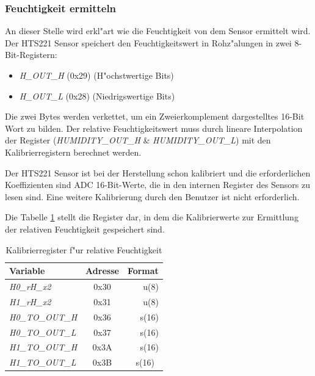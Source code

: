 \subsubsection{Feuchtigkeit ermitteln}

An dieser Stelle wird erkl"art wie die Feuchtigkeit von dem Sensor ermittelt wird.
Der HTS221 Sensor speichert den Feuchtigkeitswert in Rohz"alungen in zwei 8-Bit-Registern:
\begin{itemize}
	\item \textit{H\_OUT\_H} (0x29) (H"ochstwertige Bits)
	\item \textit{H\_OUT\_L} (0x28) (Niedrigswertige Bits)
\end{itemize}

Die zwei Bytes werden verkettet, um ein Zweierkomplement dargestelltes 16-Bit Wort zu bilden. Der relative Feuchtigkeitswert muss durch lineare Interpolation
der Register (\textit{HUMIDITY\_OUT\_H} \& \textit{HUMIDITY\_OUT\_L}) mit den Kalibrierregistern berechnet werden.

Der HTS221 Sensor ist bei der Herstellung schon kalibriert und die erforderlichen Koeffizienten sind ADC 16-Bit-Werte, die in den internen Register des Sensors zu lesen sind. Eine weitere Kalibrierung durch den Benutzer ist nicht erforderlich.

Die Tabelle \ref{tab:Reg_H} stellt die Register dar, in dem die Kalibrierwerte zur Ermittlung der relativen Feuchtigkeit gespeichert sind.

\begin{center}
	\begin{table}[htbp] 
		\centering 
		\Large
		\begin{tabular}{l|c|r}
			\textbf{Variable} & 	\textbf{Adresse} & \textbf{Format}\footnotemark\\
			\hline
			\textit{H0\_rH\_x2}	& 0x30	& u(8) \\
			\hline
			\textit{H1\_rH\_x2}	& 0x31	& u(8)\\
			\hline
			\textit{H0\_TO\_OUT\_H} & 0x36	& s(16)\\
			\hline
			\textit{H0\_TO\_OUT\_L} 	& 0x37  & s(16)\\
			\hline
			\textit{H1\_TO\_OUT\_H}	& 0x3A	& s(16)\\
			\hline
			\textit{H1\_TO\_OUT\_L} 	& 0x3B  & s(16)\
		\end{tabular} 
		\caption{Kalibrierregister f"ur relative Feuchtigkeit} 
		\label{tab:Reg_H} 
		 
	\end{table}
\end{center}

